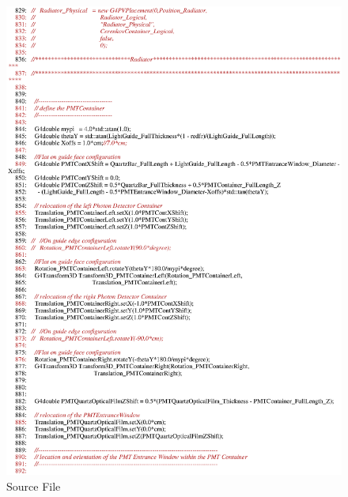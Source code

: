 \begin{figure}[ht]
  \hspace{0cm}
  \includegraphics[scale=0.8]{./figures5/QweakSimCerenkovDetector.cc-p14.eps}
  \caption{\label{SourceV14} Source File}
           \label{fig:V-SC-18}
\end{figure}
\clearpage

